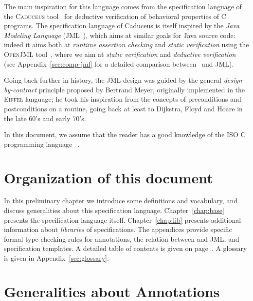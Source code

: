 
The main inspiration for this language comes from the
specification language of the \textsc{Caduceus}
tool~\cite{filliatre04icfem,filliatre07cav} for deductive verification
of behavioral properties of C programs. The specification language of
Caduceus is itself inspired by the
\emph{Java Modeling Language} (JML~\cite{leavens00jml}), which aims at
similar goals for Java source code: indeed it aims both at
\emph{runtime assertion checking} and \emph{static verification} using
the \textsc{OpenJML} tool~\cite{Cok-2011-OpenJML,Cok-2014-OpenJML}, where we aim at
\emph{static verification} and \emph{deductive verification} (see
Appendix~\ref{sec:comp-jml} for a detailed comparison between \NAME~and
JML).

Going back further in history, the JML design was guided by the general
\emph{design-by-contract} principle proposed by Bertrand Meyer,
originally implemented in
the \textsc{Eiffel} language;
he took his inspiration from the concepts of preconditions and
postconditions on a routine, going back at least to Dijkstra, Floyd and
Hoare in the late 60's and early 70's.

In this document, we assume that the reader has a good knowledge of
the ISO C programming language~\cite{KR88,standardc99} 
.

\section{Organization of this document}

In this preliminary chapter we introduce some definitions and
vocabulary, and discuss generalities about this specification
language.  Chapter~\ref{chap:base} presents the specification language
itself.  Chapter~\ref{chap:lib} presents additional information about
\emph{libraries} of specifications. The appendices provide
specific formal type-checking rules for \NAME annotations, 
the relation between \NAME and JML, and specification templates.
A detailed table of
contents is given on page~\pageref{chap:contents}.
A glossary is given in Appendix~\ref{sec:glossary}.

\section{Generalities about Annotations}\label{sec:gener-about-annot}

